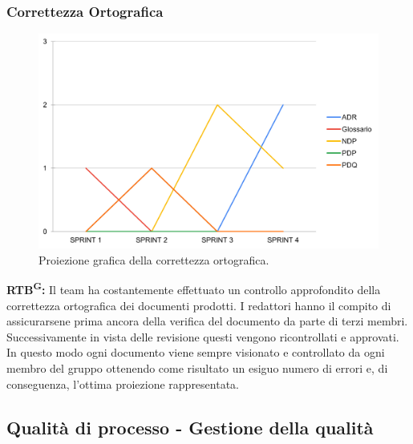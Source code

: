\documentclass[8pt]{article}
\newcommand{\glossterm}[1]{#1\textsuperscript{G}} %
\begin{document}
\subsubsection{Correttezza Ortografica}
\begin{figure}[h!]
    \centering
    \includegraphics[width=1\textwidth]{images/CO.png}
    \caption{Proiezione grafica della correttezza ortografica.}
    \label{fig:Proiezione grafica della correttezza ortografica}
\end{figure}
\textbf{\glossterm{RTB}:} Il team ha costantemente effettuato un controllo approfondito della correttezza ortografica dei documenti prodotti. I redattori hanno il compito di assicurarsene prima ancora della verifica del documento da parte di terzi membri. Successivamente in vista delle revisione questi vengono ricontrollati e approvati. In questo modo ogni documento viene sempre visionato e controllato da ogni membro del gruppo ottenendo come risultato un esiguo numero di errori e, di conseguenza, l'ottima proiezione rappresentata.
\clearpage
\subsection{Qualità di processo - Gestione della qualità}
\end{document}
